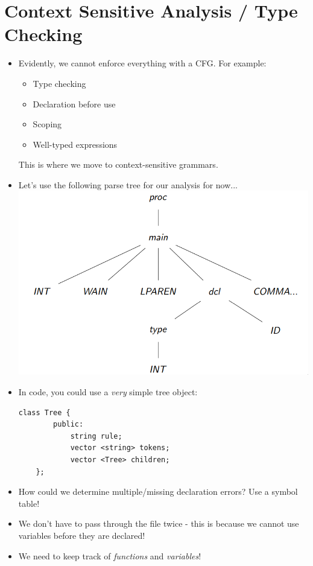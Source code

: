 \documentclass[12pt]{article}
\begin{document}
\section{Context Sensitive Analysis / Type Checking}
\begin{itemize}
    \item Evidently, we cannot enforce everything with a CFG.  For example:
        \begin{itemize}
            \item Type checking
            \item Declaration before use
            \item Scoping
            \item Well-typed expressions
        \end{itemize}
       This is where we move to context-sensitive grammars.
    \item Let's use the following parse tree for our analysis for now...\\
        \includegraphics[scale=0.5]{parse_tree.png}
    \item In code, you could use a \emph{very} simple tree object:
        \begin{lstlisting}[mathescape, numbers=none, breaklines=true]
    class Tree {
        public:
            string rule;
            vector <string> tokens;
            vector <Tree> children;
    };
        \end{lstlisting}
    \item How could we determine multiple/missing declaration errors?  Use a symbol table!
    \item We don't have to pass through the file twice - this is because we cannot use variables before they are declared!
    \item We need to keep track of \emph{functions} and \emph{variables}!  

\end{itemize}
\end{document}
